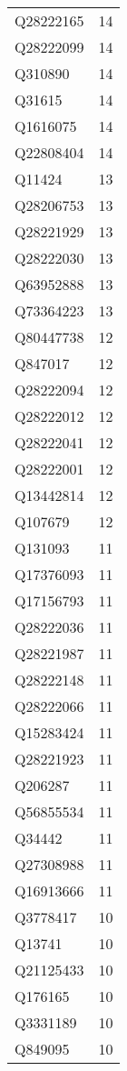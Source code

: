 \begin{tabular}{lr}
   Q28222165 &     14 \\
   Q28222099 &     14 \\
     Q310890 &     14 \\
      Q31615 &     14 \\
    Q1616075 &     14 \\
   Q22808404 &     14 \\
      Q11424 &     13 \\
   Q28206753 &     13 \\
   Q28221929 &     13 \\
   Q28222030 &     13 \\
   Q63952888 &     13 \\
   Q73364223 &     13 \\
   Q80447738 &     12 \\
     Q847017 &     12 \\
   Q28222094 &     12 \\
   Q28222012 &     12 \\
   Q28222041 &     12 \\
   Q28222001 &     12 \\
   Q13442814 &     12 \\
     Q107679 &     12 \\
     Q131093 &     11 \\
   Q17376093 &     11 \\
   Q17156793 &     11 \\
   Q28222036 &     11 \\
   Q28221987 &     11 \\
   Q28222148 &     11 \\
   Q28222066 &     11 \\
   Q15283424 &     11 \\
   Q28221923 &     11 \\
     Q206287 &     11 \\
   Q56855534 &     11 \\
      Q34442 &     11 \\
   Q27308988 &     11 \\
   Q16913666 &     11 \\
    Q3778417 &     10 \\
      Q13741 &     10 \\
   Q21125433 &     10 \\
     Q176165 &     10 \\
    Q3331189 &     10 \\
     Q849095 &     10 \\

\end{tabular}
